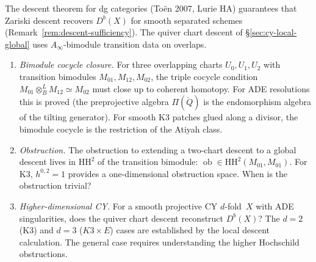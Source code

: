 \begin{openproblem}
\label{op:programme-h-descent}
The descent theorem for dg categories (To\"en 2007, Lurie HA)
guarantees that Zariski descent recovers $D^b(X)$ for smooth
separated schemes (Remark~\ref{rem:descent-sufficiency}).
The quiver chart descent of
\S\ref{sec:cy-local-global} uses $A_\infty$-bimodule transition
data on overlaps.
\begin{enumerate}[label=\textup{(\roman*)}]
\item \emph{Bimodule cocycle closure.} For three overlapping
 charts $U_0, U_1, U_2$ with transition bimodules
 $M_{01}, M_{12}, M_{02}$, the triple cocycle condition
 $M_{01} \otimes^L_B M_{12} \simeq M_{02}$ must close up
 to coherent homotopy. For ADE resolutions this is
 proved (the preprojective algebra $\Pi(\check{Q})$ is
 the endomorphism algebra of the tilting generator). For
 smooth K3 patches glued along a divisor, the bimodule
 cocycle is the restriction of the Atiyah class.
\item \emph{Obstruction.} The obstruction to extending a
 two-chart descent to a global descent lives in
 $\mathrm{HH}^2$ of the transition bimodule:
 $\operatorname{ob} \in
 \mathrm{HH}^2(M_{01}, M_{01})$. For K3, $h^{0,2} = 1$
 provides a one-dimensional obstruction space. When is
 the obstruction trivial?
\item \emph{Higher-dimensional CY.} For a smooth projective
 CY $d$-fold~$X$ with ADE singularities, does the quiver
 chart descent reconstruct $D^b(X)$? The $d = 2$ (K3)
 and $d = 3$ ($K3 \times E$) cases are established by
 the local descent calculation. The general case requires understanding
 the higher Hochschild obstructions.
\end{enumerate}
\end{openproblem}

